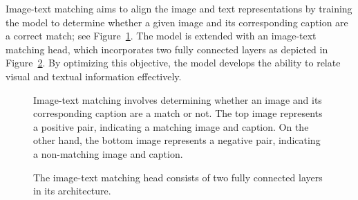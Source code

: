 Image-text matching aims to align the image and text representations by training the model to determine whether a given image and its corresponding caption are a correct match; see Figure~\ref{fig:itm}. The model is extended with an image-text matching head, which incorporates two fully connected layers as depicted in Figure~\ref{fig:itmhead}. By optimizing this objective, the model develops the ability to relate visual and textual information effectively. 

\begin{figure}
\centering
{}
\caption{Image-text matching \cite{Dou_2022_CVPR} involves determining whether an image and its corresponding caption are a match or not. The top image represents a positive pair, indicating a matching image and caption. On the other hand, the bottom image represents a negative pair, indicating a non-matching image and caption.}
\label{fig:itm}
\end{figure}

\begin{figure}
\centering
{}
\caption{
The image-text matching head \cite{Dou_2022_CVPR} consists of two fully connected layers in its architecture.}
\label{fig:itmhead}
\end{figure}

